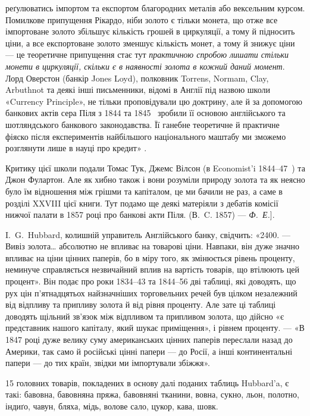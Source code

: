 \parcont{}  %
реґулюватись імпортом та експортом благородних металів або вексельним курсом.
Помилкове припущення Рікардо, ніби золото є тільки монета, що отже все імпортоване
золото збільшує кількість грошей в циркуляції, а тому й підносить ціни,
а все експортоване золото зменшує кількість монет, а тому й знижує ціни —
це теоретичне припущення стає тут \emph{практичною спробою лишати стільки
монети в циркуляції, скільки є в наявності золота в кожний даний
момент}. Лорд Оверстон (банкір Jones Loyd), полковник Torrens, Normam, Clay,
Arbuthnot та деякі інші письменники, відомі в Англії під назвою школи «Currency
Principle», не тільки проповідували цю доктрину, але й за допомогою банкових
актів сера Піля з 1844 та 1845~ зробили її основою англійського та шотляндського
банкового законодавства. Її ганебне теоретичне й практичне фіяско після
експериментів найбільшого національного маштабу ми зможемо розглянути лише
в науці про кредит» .

Критику цієї школи подали Томас Тук, Джемс Вілсон (в Economist’i 1844--47~)
та Джон Фулартон. Але як хибно також і вони розуміли природу золота
та як неясно було їм відношення між грішми та капіталом, це ми бачили не
раз, а саме в розділі XXVIII цієї книги. Тут подамо ще деякі матеріяли з дебатів
комісії нижчої палати в 1857 році про банкові акти Піля. (В.~C. 1857) — \emph{Ф.~Е.}].

I.~G.~Hubbard, колишній управитель Англійського банку, свідчить: «2400. —
Вивіз золота\dots{} абсолютно не впливає на товарові ціни. Навпаки, він дуже
значно впливає на ціни цінних паперів, бо в міру того, як змінюється рівень
проценту, неминуче справляється незвичайний вплив на вартість товарів, що втілюють
цей процент». Він подає про роки 1834--43 та 1844--56 дві таблиці,
які доводять, що рух цін п’ятнадцятьох найзначніших торговельних речей був
цілком незалежний від відпливу та припливу золота й від рівня проценту. Але
зате ці таблиці доводять щільний зв’язок між відпливом та припливом золота,
що дійсно «є представник нашого капіталу, який шукає приміщення», і рівнем
проценту. — «В 1847 році дуже велику суму американських цінних паперів переслали
назад до Америки, так само й російські цінні папери — до Росії, а інші
континентальні папери — до тих країн, звідки ми імпортували збіжжя».

15 головних товарів, покладених в основу далі поданих таблиць Hubbard’a,
є такі: бавовна, бавовняна пряжа, бавовняні тканини, вовна, сукно,
льон, полотно, індиґо, чавун, бляха, мідь, волове сало, цукор, кава, шовк.


